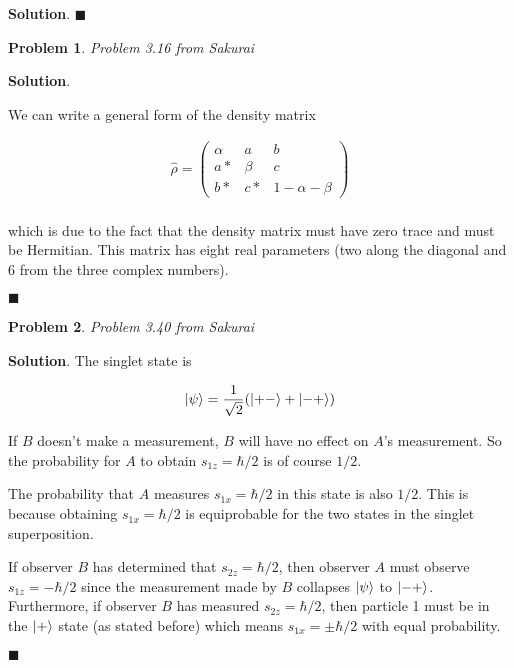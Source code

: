 \documentclass[12pt]{article}
\newtheorem{p}{Problem}
\theoremstyle{definition}
\newenvironment{s}{%
        \begin{trivlist} \item \textbf{Solution}. }{%
            \hspace*{\fill} $\blacksquare$\end{trivlist}}%
\begin{document}
{\begin{s}
\end{s}

\begin{p}
Problem 3.16 from Sakurai
\end{p}

\begin{s}

We can write a general form of the density matrix

\begin{align*}
\hat{\rho} = \begin{pmatrix}\alpha&a&b\\a*&\beta&c\\b*&c*&1-\alpha-\beta\end{pmatrix}\\
\end{align*}

which is due to the fact that the density matrix must have zero trace and must be Hermitian. This matrix has eight real parameters (two along the diagonal and 6 from the three complex numbers).

\end{s}

\begin{p}
Problem 3.40 from Sakurai
\end{p}

\begin{s}
The singlet state is 

\begin{align*}
\ket{\psi} = \frac{1}{\sqrt{2}}(\ket{+-} + \ket{-+})
\end{align*}

If $B$ doesn't make a measurement, $B$ will have no effect on $A$'s measurement. So the probability for $A$ to obtain $s_{1z} = \hbar/2$ is of course $1/2$. 

The probability that $A$ measures $s_{1x} = \hbar/2$ in this state is also $1/2$. This is because obtaining $s_{1x} = \hbar/2$ is equiprobable for the two states in the singlet superposition. 

If observer $B$ has determined that $s_{2z} = \hbar/2$, then observer $A$ must observe $s_{1z} = -\hbar/2$ since the measurement made by $B$ collapses $\ket{\psi}$ to $\ket{-+}$. Furthermore, if observer $B$ has measured $s_{2z} = \hbar/2$, then particle 1 must be in the $\ket{+}$ state (as stated before) which means $s_{1x} = \pm \hbar/2$ with equal probability.

\end{s}
\end{document}
